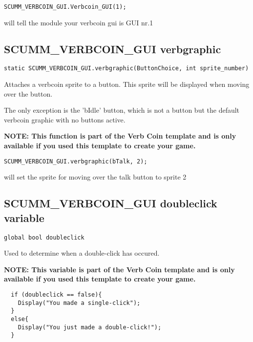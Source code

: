 \begin{verbatim}
SCUMM_VERBCOIN_GUI.Verbcoin_GUI(1);
\end{verbatim}

will tell the module your verbcoin gui is GUI nr.1


\subsection{SCUMM_VERBCOIN_GUI verbgraphic}\label{SCUMM_VERBCOIN_GUI.verbgraphic}%

\begin{verbatim}
static SCUMM_VERBCOIN_GUI.verbgraphic(ButtonChoice, int sprite_number)
\end{verbatim}
Attaches a verbcoin sprite to a button. This sprite will be displayed when
moving over the button.

The only exception is the 'bIdle' button, which is not a button but the default
verbcoin graphic with no buttons active.

\bf{NOTE:} This function is part of the Verb Coin template and is only available if
you used this template to create your game.

\begin{verbatim}
SCUMM_VERBCOIN_GUI.verbgraphic(bTalk, 2);
\end{verbatim}

will set the sprite for moving over the talk button to sprite 2


\subsection{SCUMM_VERBCOIN_GUI doubleclick variable}\label{SCUMM_VERBCOIN_GUI.doubleclick}%

\begin{verbatim}
global bool doubleclick
\end{verbatim}
Used to determine when a double-click has occured.

\bf{NOTE:} This variable is part of the Verb Coin template and is only available if
you used this template to create your game.

\begin{verbatim}
  if (doubleclick == false){
    Display("You made a single-click");
  }
  else{
    Display("You just made a double-click!");
  }
\end{verbatim}

